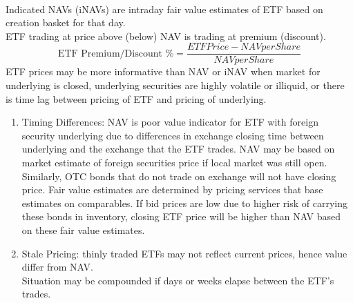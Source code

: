 \begin{remark} \\
Indicated NAVs (iNAVs) are intraday fair value estimates of ETF based on creation basket for that day.\\
ETF trading at price above (below) NAV is trading at premium (discount).
\begin{equation}
\text{ETF Premium/Discount } \% = \frac{ETF Price - NAV per Share}{NAV per Share} \nonumber
\end{equation}
ETF prices may be more informative than NAV or iNAV when market for underlying is closed, underlying securities are highly volatile or illiquid, or there is time lag between pricing of ETF and pricing of underlying.
\end{remark}

\begin{remark} 
\begin{enumerate}[label=\roman*.]
\setlength{\itemsep}{0pt}
\item Timing Differences: NAV is poor value indicator for ETF with foreign security underlying due to differences in exchange closing time between underlying and the exchange that the ETF trades. NAV may be based on market estimate of foreign securities price if local market was still open.\\
Similarly, OTC bonds that do not trade on exchange will not have closing price. Fair value estimates are determined by pricing services that base estimates on comparables. If bid prices are low due to higher risk of carrying these bonds in inventory, closing ETF price will be higher than NAV based on these fair value estimates.
\item Stale Pricing: thinly traded ETFs may not reflect current prices, hence value differ from NAV.\\
Situation may be compounded if days or weeks elapse between the ETF's trades.
\end{enumerate}
\end{remark}

